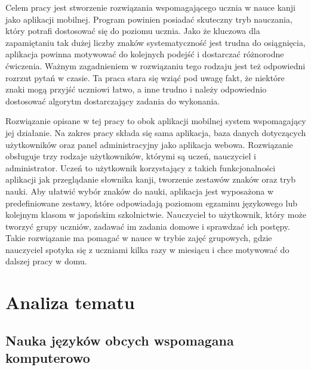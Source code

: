 \documentclass[a4paper,twoside,12pt]{book}
\newcommand{\obcy}[1]{\emph{#1}}
\newcommand{\english}[1]{{\selectlanguage{british}\obcy{#1}}}
\begin{document}
Celem pracy jest stworzenie rozwiązania wspomagającego ucznia w nauce kanji jako aplikacji mobilnej. Program powinien posiadać skuteczny tryb nauczania, który potrafi dostosować się do poziomu ucznia. Jako że kluczowa dla zapamiętaniu tak dużej liczby znaków systematyczność jest trudna do osiągnięcia, aplikacja powinna motywować do kolejnych podejść i dostarczać różnorodne ćwiczenia. Ważnym zagadnieniem w rozwiązaniu tego rodzaju jest też odpowiedni rozrzut pytań w czasie. Ta praca stara się wziąć pod uwagę fakt, że niektóre znaki mogą przyjść uczniowi łatwo, a inne trudno i należy odpowiednio dostosować algorytm dostarczający zadania do wykonania.

Rozwiązanie opisane w tej pracy to obok aplikacji mobilnej system wspomagający jej działanie. Na zakres pracy składa się sama aplikacja, baza danych dotyczących użytkowników oraz panel administracyjny jako aplikacja webowa. Rozwiązanie obsługuje trzy rodzaje użytkowników, którymi są uczeń, nauczyciel i administrator. Uczeń to użytkownik korzystający z takich funkcjonalności aplikacji jak przeglądanie słownika kanji, tworzenie zestawów znaków oraz tryb nauki. Aby ułatwić wybór znaków do nauki, aplikacja jest wyposażona w predefiniowane zestawy, które odpowiadają poziomom egzaminu językowego lub kolejnym klasom w japońskim szkolnictwie. Nauczyciel to użytkownik, który może tworzyć grupy uczniów, zadawać im zadania domowe i sprawdzać ich postępy. Takie rozwiązanie ma pomagać w nauce w trybie zajęć grupowych, gdzie nauczyciel spotyka się z uczniami kilka razy w miesiącu i chce motywować do dalszej pracy w domu. 

\chapter{Analiza tematu}

\section{Nauka języków obcych wspomagana komputerowo}
\end{document}
